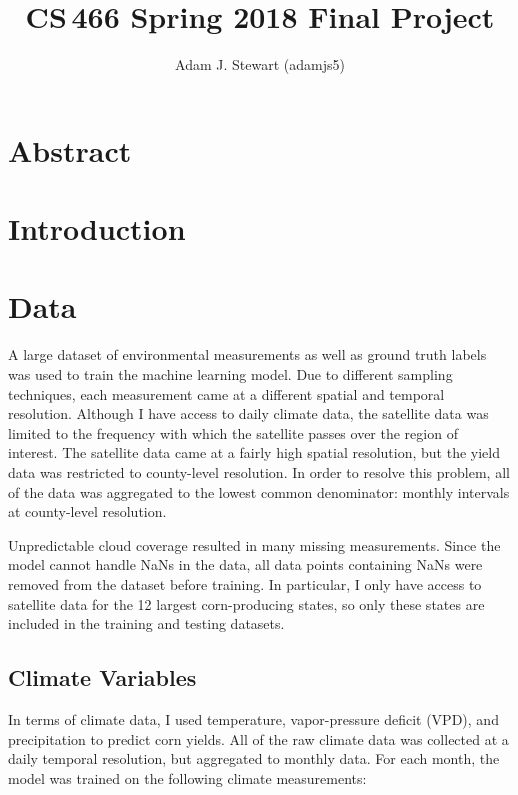 \documentclass[letterpaper]{article}
\begin{document}
\title{CS\,466 Spring 2018 Final Project}
\author{Adam J. Stewart (adamjs5)}

\maketitle

\section{Abstract}

\section{Introduction}

\section{Data}

A large dataset of environmental measurements as well as ground truth labels was used to train the machine learning model. Due to different sampling techniques, each measurement came at a different spatial and temporal resolution. Although I have access to daily climate data, the satellite data was limited to the frequency with which the satellite passes over the region of interest. The satellite data came at a fairly high spatial resolution, but the yield data was restricted to county-level resolution. In order to resolve this problem, all of the data was aggregated to the lowest common denominator: monthly intervals at county-level resolution.

Unpredictable cloud coverage resulted in many missing measurements. Since the model cannot handle NaNs in the data, all data points containing NaNs were removed from the dataset before training. In particular, I only have access to satellite data for the 12 largest corn-producing states, so only these states are included in the training and testing datasets.

\subsection{Climate Variables}

In terms of climate data, I used temperature, vapor-pressure deficit (VPD), and precipitation to predict corn yields. All of the raw climate data was collected at a daily temporal resolution, but aggregated to monthly data. For each month, the model was trained on the following climate measurements:
\end{document}
